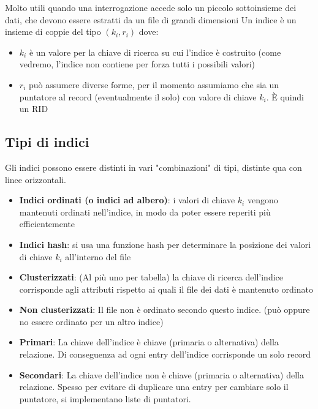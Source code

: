 Molto utili quando una interrogazione accede solo un piccolo sottoinsieme dei dati, che devono essere estratti da un file di grandi dimensioni
Un indice è un insieme di coppie del tipo $(k_i, r_i)$ dove:
\begin{itemize}
    \item $k_i$ è un valore per la chiave di ricerca su cui l'indice è costruito (come vedremo, l'indice non contiene per forza tutti i possibili valori)
    \item $r_i$ può assumere diverse forme, per il momento assumiamo che sia un puntatore al record (eventualmente il solo) con valore di chiave $k_i$. \`E quindi un RID
\end{itemize}

\subsection{Tipi di indici}
Gli indici possono essere distinti in vari "combinazioni" di tipi, distinte qua con linee orizzontali.
\hrulefill
\begin{itemize}
    \item \textbf{Indici ordinati (o indici ad albero)}: i valori di chiave $k_i$ vengono mantenuti ordinati nell'indice, in modo da poter essere reperiti più efficientemente
    
    \item \textbf{Indici hash}: si usa una funzione hash per determinare la posizione dei valori di chiave $k_i$ all'interno del file
\end{itemize}

\hrulefill

\begin{itemize}
    \item \textbf{Clusterizzati}: (Al più uno per tabella) la chiave di ricerca dell'indice corrisponde agli attributi rispetto ai quali il file dei dati è mantenuto ordinato
    \item \textbf{Non clusterizzati}: Il file non \`e ordinato secondo questo indice. (può oppure no essere ordinato per un altro indice)
\end{itemize}

\hrulefill

\begin{itemize}
    \item \textbf{Primari}: La chiave dell'indice è chiave (primaria o alternativa) della relazione. Di conseguenza ad ogni entry dell'indice corrisponde un solo record
    \item \textbf{Secondari}: La chiave dell'indice non è chiave (primaria o alternativa) della relazione. Spesso per evitare di duplicare una entry per cambiare solo il puntatore, si implementano liste di puntatori.
\end{itemize}

